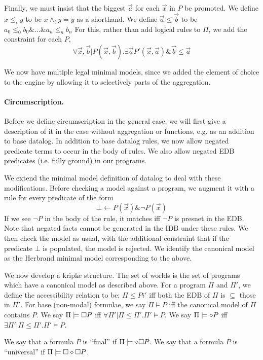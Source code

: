 Finally, we must insist that the biggest $\vec{a}$ for each $\vec{x}$ in $P$ be promoted. 
We define $x \leq_i y$ to be $x \wedge_i y = y$ as a shorthand.
We define $\vec{a} \leq \vec{b}$ to be $a_0 \leq_0 b_0 \& ... \& a_n \leq_n b_n$
For this, rather than add logical rules to $\Pi$, we add the constraint for each $P$,
\[
	\forall \vec{x}, \vec{b} | P(\vec{x}, \vec{b}). \exists \vec{a} P'(\vec{x}, \vec{a}) \& \vec{b} \leq \vec{a}
\]

We now have multiple legal minimal models, since we added the element of choice to the engine by allowing it to selectively parts of the aggregation.
\paragraph{Circumscription.}
Before we define circumscription in the general case, we will first give a description of it in the case without aggregation or functions, e.g. as an addition to base datalog.
In addition to base datalog rules, we now allow negated predicate terms to occur in the body of rules.
We also allow negated EDB predicates (i.e. fully ground) in our programs.

We extend the minimal model definition of datalog to deal with these modifications.
Before checking a model against a program, we augment it with a rule for every predicate of the form
\[
	\bot \leftarrow P(\vec{x}) \& \neg P(\vec{x})
\]
If we see $\neg P$ in the body of the rule, it matches iff $\neg P$ is presnet in the EDB.
Note that negated facts cannot be generated in the IDB under these rules.
We then check the model as usual, with the additional constraint that if the predicate $\bot$ is populated, the model is rejected.
We identify the canonical model as the Herbrand minimal model corresponding to the above.

We now develop a kripke structure.
The set of worlds is the set of programs which have a canonical model as described above.
For a program $\Pi$ and $\Pi'$, we define the accessibility relation to be: $\Pi \leq Pi'$ iff both the EDB of $\Pi$ is $\subseteq$ those in $\Pi'$.
For base (non-modal) formulae, we say $\Pi \models P$ iff the canonical model of $\Pi$ contains $P$.
We say $\Pi \models \square P$ iff $\forall \Pi' | \Pi \leq \Pi'. \Pi' \models P$.
We say $\Pi \models \diamond P$ iff $\exists \Pi' | \Pi \leq \Pi'. \Pi' \models P$.

We say that a formula $P$ is ``final'' if $\Pi \models \diamond \square P$.
We say that a formula $P$ is ``universal'' if $\Pi \models \square \diamond \square P$.

